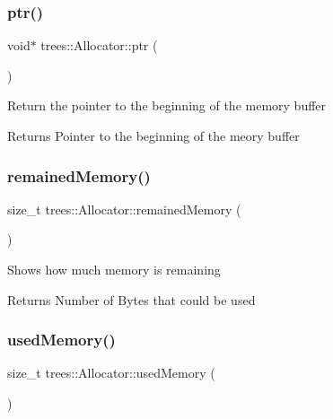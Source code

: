 \subsubsection{\texorpdfstring{ptr()}{ptr()}}
{\footnotesize\ttfamily void$\ast$ trees\+::\+Allocator\+::ptr (\begin{DoxyParamCaption}{ }\end{DoxyParamCaption})\hspace{0.3cm}{\ttfamily [inline]}}

Return the pointer to the beginning of the memory buffer

\begin{DoxyReturn}{Returns}
Pointer to the beginning of the meory buffer 
\end{DoxyReturn}
\mbox{\label{classtrees_1_1_allocator_ad9a9e6fb8eeca7d3f8cb89e24a2da54f}} 
\subsubsection{\texorpdfstring{remained\+Memory()}{remainedMemory()}}
{\footnotesize\ttfamily size\+\_\+t trees\+::\+Allocator\+::remained\+Memory (\begin{DoxyParamCaption}{ }\end{DoxyParamCaption})\hspace{0.3cm}{\ttfamily [inline]}}

Shows how much memory is remaining

\begin{DoxyReturn}{Returns}
Number of Bytes that could be used 
\end{DoxyReturn}
\mbox{\label{classtrees_1_1_allocator_af3266a905a5482ac22c24f5c2b2349fd}} 
\subsubsection{\texorpdfstring{used\+Memory()}{usedMemory()}}
{\footnotesize\ttfamily size\+\_\+t trees\+::\+Allocator\+::used\+Memory (\begin{DoxyParamCaption}{ }\end{DoxyParamCaption})\hspace{0.3cm}{\ttfamily [inline]}}

